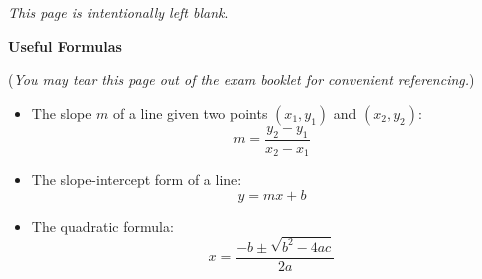 \documentclass[addpoints,14pt,answers]{exam}
\begin{document}
\vfill

\newpage
\phantom{.}
\vfill
\begin{center}
   \textit{This page is intentionally left blank}.
\end{center}
\vfill

\newpage

\begin{center}
   {\Large \textbf{Useful Formulas}}
\end{center}

(\textit{You may tear this page out of the exam booklet for convenient referencing.})

\begin{itemize}
   \item The slope $m$ of a line given two points $(x_1,y_1)$ and $(x_2,y_2)$: 
   \[m = \frac{y_2-y_1}{x_2-x_1}\]
   \item The slope-intercept form of a line:
   \[y=mx+b\]
   \item The quadratic formula:
   \[x = \frac{-b\pm\sqrt{b^2-4ac}}{2a}\]
\end{itemize}
\end{document}
